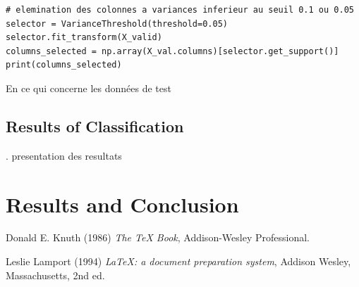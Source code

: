 \documentclass[12pt]{article}
\begin{document}
\begin{lstlisting}
# elemination des colonnes a variances inferieur au seuil 0.1 ou 0.05
selector = VarianceThreshold(threshold=0.05)
selector.fit_transform(X_valid)
columns_selected = np.array(X_val.columns)[selector.get_support()] 
print(columns_selected)
\end{lstlisting}
En ce qui concerne les données de test 



\subsection{Results of Classification} 
. presentation des resultats


\section{Results and Conclusion}


\begin{thebibliography}{9}


Donald E. Knuth (1986) \emph{The \TeX{} Book}, Addison-Wesley Professional.

Leslie Lamport (1994) \emph{\LaTeX: a document preparation system}, Addison
Wesley, Massachusetts, 2nd ed.


\end{thebibliography}
\end{document}
